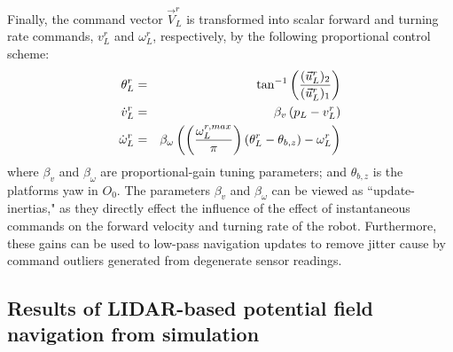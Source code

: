 			Finally, the command vector $\vec{V}_{L}^{r}$ is transformed into scalar forward and turning rate commands, ${v}_{L}^{r}$ and $\omega_{L}^{r}$, respectively, by the following proportional control scheme:
				\begin{eqnarray}
					\theta_{L}^{r} 			&=& \tan^{-1}\left( \frac{(\vec{u}^{r}_{L})_{2} }{(\vec{u}^{r}_{L})_{1}} \right) \nonumber\\
					\dot{v}_{L}^{r} 			&=& \beta_{v} \left( p_{L} - v_{L}^{r} \right) \nonumber \\
					\dot{\omega}_{L}^{r} 	&=& \beta_{\omega} \left( \left( \frac{ \omega_{L}^{r,max} }{\pi} \right) \left(  \theta_{L}^{r} - \theta_{b,z} \right) - \omega_{L}^{r} \right)
				\end{eqnarray}
			where $\beta_{v}$ and $\beta_{\omega}$ are proportional-gain tuning parameters; and $\theta_{b,z}$ is the platforms yaw in $O_{0}$. The parameters $\beta_{v}$ and $\beta_{\omega}$ can be viewed as ``update-inertias," as they directly effect the influence of the effect of instantaneous commands on the forward velocity and turning rate of the robot. Furthermore, these gains can be used to low-pass navigation updates to remove jitter cause by command outliers generated from degenerate sensor readings.


		\subsection{Results of LIDAR-based potential field navigation from simulation}

